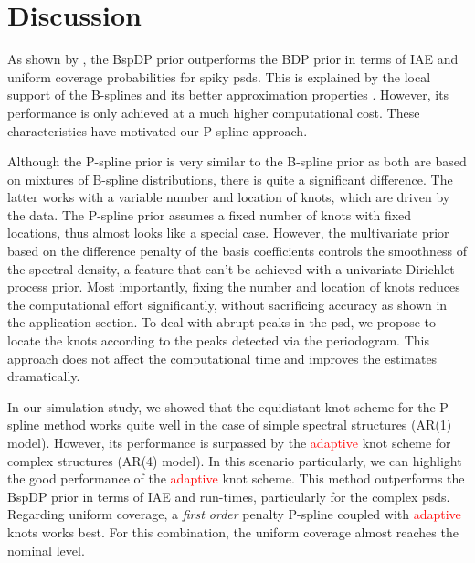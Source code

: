 \documentclass[twocolumn,final]{svjour3}
\begin{document}

\section{Discussion}

As shown by \cite{Edwards2019}, the BspDP prior outperforms the BDP prior in terms of IAE and uniform coverage probabilities for spiky psds.  This is explained by the local support of the B-splines and its better approximation properties \citep{Edwards2019}.  However, its performance is only achieved at a much higher computational cost.  These characteristics have motivated our P-spline approach.  

Although the P-spline prior is very similar to the B-spline prior as both are based on mixtures of B-spline distributions, there is quite a significant difference.  The latter works with a variable number and location of knots, which are driven by the data.  The P-spline prior assumes a fixed number of knots  with fixed locations, thus almost looks like a special case. However, the multivariate prior based on the difference penalty of the basis coefficients controls the smoothness of the spectral density, a feature that can't be achieved with a univariate Dirichlet process prior. Most importantly, fixing the number and location of knots reduces the computational effort significantly, without sacrificing accuracy as shown in the application section.  To deal with abrupt peaks in the psd, we propose to locate the knots according to the peaks detected via the periodogram.  This approach does not affect the computational time and improves the estimates dramatically. %

In our simulation study, we showed that the equidistant knot scheme for the P-spline method works quite well in the case of simple spectral structures (AR(1) model).  However, its performance is surpassed by the \textcolor{red}{adaptive} knot scheme for complex structures (AR(4) model).  In this scenario particularly, we can highlight the good performance of the \textcolor{red}{adaptive} knot scheme. This method outperforms the BspDP prior in terms of IAE and run-times, particularly for the complex psds.    Regarding uniform coverage,  a {\em first order} penalty P-spline coupled with
\textcolor{red}{adaptive} knots works best. For this combination, the uniform coverage almost reaches the nominal level.
\end{document}
